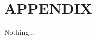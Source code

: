 \documentclass[letterpaper, 10 pt, conference]{ieeeconf}  %
\begin{document}
\section*{APPENDIX}

Nothing...


\balance

\makeatletter
\def\endthebibliography{%
	\def\@noitemerr{\@latex@warning{Empty `thebibliography' environment}}%
	\endlist
}
\makeatother



\end{document}
